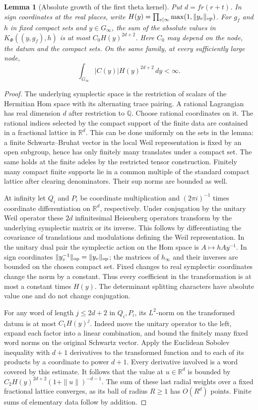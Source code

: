 \documentclass[a4paper,11pt]{article}
\newtheorem{lemma}[proposition]{Lemma}
\theoremstyle{definition}
\theoremstyle{remark}
\numberwithin{equation}{section}
\begin{document}
\begin{lemma}[Absolute growth of the first theta kernel]\leavevmode
\label{lem:thetagrowth708}
Put \(d=f r(r+t)\). In sign coordinates at the real places,
write \(H(y)=\prod_{v\mid\infty}\max(1,\|y_v\|_{\rm op})\).
For \(g_f\) and \(h\) in fixed compact sets and \(y\in G_\infty\),
the sum of the absolute values in \(K_\Phi((y,g_f),h)\) is
at most \(C_0 H(y)^{2d+2}\). Here \(C_0\) may depend on the
node, the datum and the compact sets. On the same family, at
every sufficiently large node,
\[
               \int_{G_\infty}|C(y)|H(y)^{2d+2}\,dy<\infty .
\]
\end{lemma}
\begin{proof}
The underlying symplectic space is the restriction of scalars
of the Hermitian Hom space with its alternating trace pairing.
A rational Lagrangian has real dimension \(d\) after restriction
to \(\mathbb Q\). Choose rational coordinates on it. The
rational indices selected by the compact support of the
finite data are contained in a fractional lattice in
\(\mathbb R^d\). This can be done uniformly on the sets in the
lemma: a finite Schwartz--Bruhat vector in the local Weil
representation is fixed by an open subgroup, hence has only
finitely many translates under a compact set. The same holds
at the finite adeles by the restricted tensor construction.
Finitely many compact finite supports lie in a common
multiple of the standard compact lattice after clearing
denominators. Their sup norms are bounded as well.

At infinity let \(Q_i\) and \(P_i\) be coordinate multiplication
and \((2\pi i)^{-1}\) times coordinate differentiation on
\(\mathbb R^d\), respectively. Under conjugation by the
unitary Weil operator these \(2d\) infinitesimal Heisenberg
operators transform by the underlying symplectic matrix or
its inverse. This follows by differentiating the covariance
of translations and modulations defining the Weil
representation. In the unitary dual pair the symplectic
action on the Hom space is \(A\mapsto hAy^{-1}\). In sign
coordinates \(\|y_v^{-1}\|_{\rm op}=\|y_v\|_{\rm op}\);
the matrices of \(h_\infty\) and their inverses are bounded
on the chosen compact set. Fixed changes to real symplectic
coordinates change the norm by a constant. Thus every
coefficient in the transformation is at most a constant
times \(H(y)\). The determinant splitting characters have
absolute value one and do not change conjugation.

For any word of length \(j\le 2d+2\) in \(Q_i,P_i\),
its \(L^2\)-norm on the transformed datum is at most
\(C_1 H(y)^j\). Indeed move the unitary operator to the
left, expand each factor into a linear combination, and
bound the finitely many fixed word norms on the original
Schwartz vector. Apply the Euclidean Sobolev inequality
with \(d+1\) derivatives to the transformed function and
to each of its products by a coordinate to power \(d+1\).
Every derivative involved is a word covered by this estimate.
It follows that the value at \(u\in\mathbb R^d\) is bounded by
\(C_2 H(y)^{2d+2}(1+\|u\|)^{-d-1}\). The sum of these
last radial weights over a fixed fractional lattice converges,
as its ball of radius \(R\ge1\) has \(O(R^d)\) points.
Finite sums of elementary data follow by addition.


\end{proof}
\end{document}
